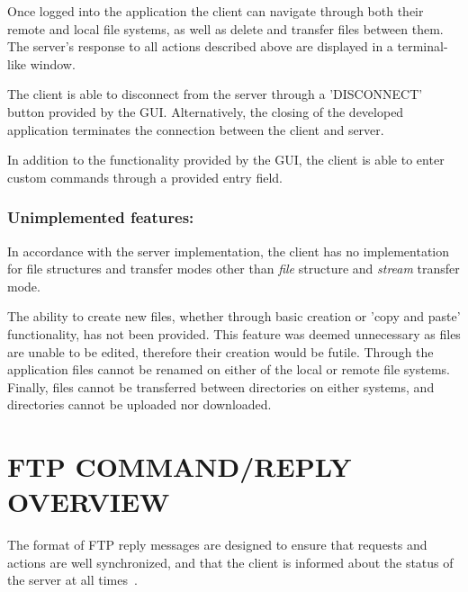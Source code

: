 \documentclass[10pt,twocolumn]{witseiepaper}
\begin{document}

Once logged into the application the client can navigate through both their remote and local file systems, as well as delete and transfer files between them. The server's response to all actions described above are displayed in a terminal-like window. 

The client is able to disconnect from the server through a 'DISCONNECT' button provided by the GUI. Alternatively, the closing of the developed application terminates the connection between the client and server.

In addition to the functionality provided by the GUI, the client is able to enter custom commands through a provided entry field. 


\vspace*{-\baselineskip}
\subsubsection*{Unimplemented features: } 
In accordance with the server implementation, the client has no implementation for file structures and transfer modes other than \textit{file} structure and \textit{stream} transfer mode.

The ability to create new files, whether through basic creation or 'copy and paste' functionality, has not been provided. This feature was deemed unnecessary as files are unable to be edited, therefore their creation would be futile. Through the application files cannot be renamed on either of the local or remote file systems. Finally, files cannot be transferred between directories on either systems, and directories cannot be uploaded nor downloaded.


\section{FTP COMMAND/REPLY OVERVIEW}\label{sec:command/reply}

The format of FTP reply messages are designed to ensure that requests and actions are well synchronized, and that the client is informed about the status of the server at all times~\cite{rfc959}. 
\end{document}
